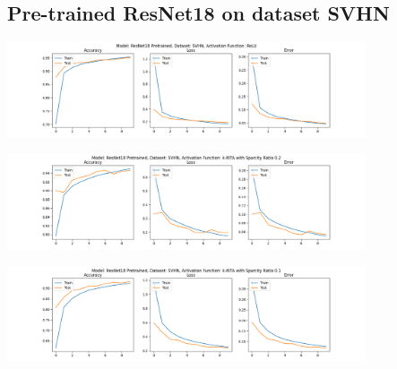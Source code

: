 \documentclass[a4paper]{article}
\begin{document}
		\subsection{Pre-trained ResNet18 on dataset SVHN}
			\begin{center}
				\centering
				\includegraphics[width=400px,keepaspectratio]{Results/ResNet18_SVHN_ReLU_Pretrained.png}
			\end{center}
			\begin{center}
				\centering
				\includegraphics[width=400px,keepaspectratio]{Results/ResNet18_SVHN_k-WTA_0.2_Pretrained.png}
			\end{center}
			\begin{center}
				\centering
				\includegraphics[width=400px,keepaspectratio]{Results/ResNet18_SVHN_k-WTA_0.1_Pretrained.png}
			\end{center}
		
\end{document}
